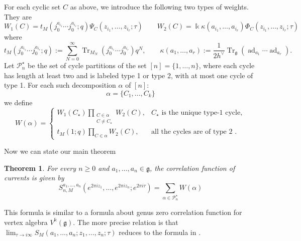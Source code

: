 \documentclass[11pt,a4paper]{amsart}
\numberwithin{equation}{section}
\newtheorem{maintheorem}{Theorem}
\theoremstyle{definition}
\theoremstyle{remark}
\DeclareMathOperator{\Tr}{Tr}
\DeclareMathOperator{\ad}{ad}
\newcommand{\g}{\mathfrak g}
\newcommand{\kk}{\Bbbk}
\newcommand{\cP}{\mathcal P}
\begin{document}
For each cyclic set $C$ as above, we introduce the following two types of weights.
They are 
\begin{equation*}
W_1(C)=t_M(j_0^{a_{i_1}}\cdots j_0^{a_{i_r}};q)\Psi_C ( z_{i_1 } , \dots , z_{i_r } ; \tau )
\qquad
W_2(C)=\kk\kappa(a_{i_1},\ldots,a_{i_r})\Phi_C ( z_{i_1 } , \dots , z_{i_r } ; \tau )
\end{equation*}
where
\begin{equation*}
t_M(j_0^{a_{i_1}}\cdots j_0^{a_{i_r}};q)  :=\sum_{N =0}^\infty \Tr_{M_{N}}(j_0^{a_{i_1}}\cdots j_0^{a_{i_r}} )q^N,
\qquad
\kappa(a_1,\ldots,a_r):=\frac{1}{2h^\vee}
\Tr_\g(\ad_{a_1}\cdots\ad_{a_r}).
\end{equation*}
Let $\cP_n^\star$ be  the set of  cycle partitions of the set $[n]= \{ 1 , \dots , n \}$, where each cycle has length at least two and is labeled type 1 or type 2, with at most one cycle of type 1.  For each such decomposition $\alpha $ of $[n]$:
\[  \alpha = \{  C_1 ,  \dots , C_k \}   \]
we define 
\[  W ( \alpha ) = \begin{cases}
\displaystyle W_1(C_\star)
\prod_{\substack{C\in\alpha\\C\neq C_\star}}W_2(C),
&C_\star \text{ is the unique type-1 cycle},\\[2ex]
\displaystyle t_M(1;q)\prod_{C\in\alpha}W_2(C),
& \text{all the cycles are of type 2 }.
\end{cases}                            \]

Now we can state our main theorem 


\begin{maintheorem}	\label{theoremB}
	For every $n\geq0$ and $a_1,\ldots,a_n\in\g$, the correlation function of currents is given by
	\begin{equation*}
	S_{n, M}^{ a_1 , \dots , a_n} ( e^{2\pi i z_1}  , \dots ,e^{2\pi i z_n}  ; e^{2\pi i \tau } ) 
	=\sum_{\alpha\in\cP_n^\star}  W ( \alpha )
	\end{equation*}
\end{maintheorem}

This formula is similar to a formula about genus zero correlation function for vertex algebra $ V^\kk ( \g )$. The more precise relation is that $ \lim_{ \tau \to i \infty }	S_{M} ( a_1 , \dots , a_n; z_1 , \dots , z_n ; \tau ) $ reduces to the formula in \cite{FrenkelZhu}.

\
\end{document}
